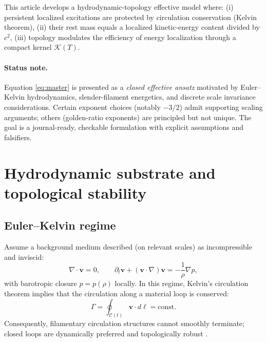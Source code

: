 \documentclass[11pt]{article}
\theoremstyle{definition}
\theoremstyle{plain}
\theoremstyle{remark}
\begin{document}
            This article develops a hydrodynamic-topology effective model where:
            (i) persistent localized excitations are protected by circulation conservation (Kelvin theorem),
            (ii) their rest mass equals a localized kinetic-energy content divided by $c^{2}$,
            (iii) topology modulates the efficiency of energy localization through a compact kernel $\mathcal{K}(T)$.

            \paragraph{Status note.}
                Equation \eqref{eq:master} is presented as a \emph{closed effective ansatz} motivated by Euler--Kelvin hydrodynamics, slender-filament energetics, and discrete scale invariance considerations. Certain exponent choices (notably $-3/2$) admit supporting scaling arguments; others (golden-ratio exponents) are principled but not unique. The goal is a journal-ready, checkable formulation with explicit assumptions and falsifiers.

        \section{Hydrodynamic substrate and topological stability}

        \subsection{Euler--Kelvin regime}
            Assume a background medium described (on relevant scales) as incompressible and inviscid:
            \begin{equation}
                \nabla\cdot \mathbf{v}=0,
                \qquad
                \partial_t \mathbf{v}+(\mathbf{v}\cdot\nabla)\mathbf{v}=-\frac{1}{\rho}\nabla p,
                \label{eq:euler}
            \end{equation}
            with barotropic closure $p=p(\rho)$ locally. In this regime, Kelvin's circulation theorem implies that the circulation along a material loop is conserved:
            \begin{equation}
                \Gamma=\oint_{\mathcal{C}(t)} \mathbf{v}\cdot d\boldsymbol{\ell}=\text{const.}
                \label{eq:kelvin}
            \end{equation}
            Consequently, filamentary circulation structures cannot smoothly terminate; closed loops are dynamically preferred and topologically robust \cite{Kelvin1869,Batchelor1967,Saffman1992}.
\end{document}
